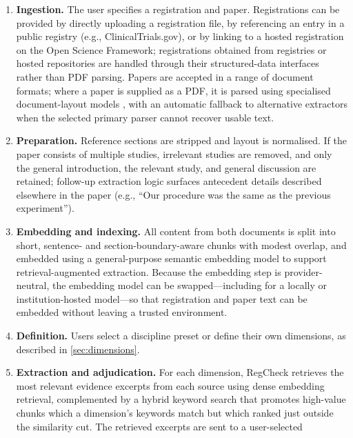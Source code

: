 \documentclass{article}
\begin{document}
\begin{enumerate}
  \item \textbf{Ingestion.} The user specifies a registration and paper.
  Registrations can be provided by directly uploading a registration file, by
  referencing an entry in a public registry (e.g., ClinicalTrials.gov), or by
  linking to a hosted registration on the Open Science Framework; registrations
  obtained from registries or hosted repositories are handled through their
  structured-data interfaces rather than PDF parsing. Papers are accepted in a
  range of document formats; where a paper is supplied as a PDF, it is parsed
  using specialised document-layout models \citep{grobid_grobid_2025,
  huang_document_2025}, with an automatic fallback to alternative extractors
  when the selected primary parser cannot recover usable text.
  \item \textbf{Preparation.} Reference sections are stripped and layout is
  normalised. If the paper consists of multiple studies, irrelevant studies are
  removed, and only the general introduction, the relevant study, and general
  discussion are retained; follow-up extraction logic surfaces antecedent
  details described elsewhere in the paper (e.g., ``Our procedure was the same
  as the previous experiment'').
  \item \textbf{Embedding and indexing.} All content from both documents is
  split into short, sentence- and section-boundary-aware chunks with modest
  overlap, and embedded using a general-purpose semantic embedding model to
  support retrieval-augmented extraction. Because the embedding step is
  provider-neutral, the embedding model can be swapped---including for a locally
  or institution-hosted model---so that registration and paper text can be
  embedded without leaving a trusted environment.
  \item \textbf{Definition.} Users select a discipline preset or define their
  own dimensions, as described in \cref{sec:dimensions}.
  \item \textbf{Extraction and adjudication.} For each dimension, RegCheck
  retrieves the most relevant evidence excerpts from each source using dense
  embedding retrieval, complemented by a hybrid keyword search that promotes
  high-value chunks which a dimension's keywords match but which ranked just
  outside the similarity cut. The retrieved excerpts are sent to a user-selected

\end{enumerate}
\end{document}
